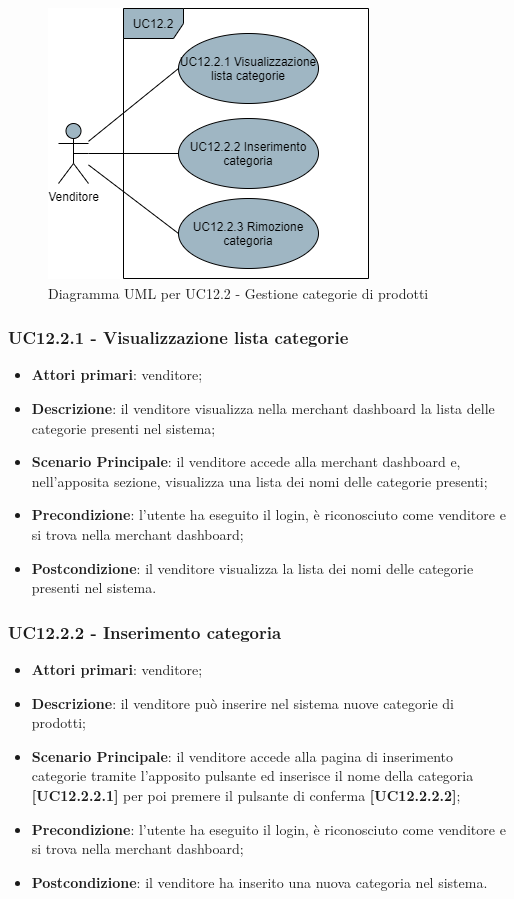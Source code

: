 \begin{figure}[H]
\centering
\includegraphics[scale=0.6]{res/UseCase/Immagini/GestioneCategorie}
\caption{Diagramma UML per UC12.2 - Gestione categorie di prodotti}
\end{figure}

\subsubsection{UC12.2.1 - Visualizzazione lista categorie}
\begin{itemize}
\item \textbf{Attori primari}: venditore;
\item \textbf{Descrizione}: il venditore visualizza nella merchant dashboard la lista delle categorie presenti nel sistema;
\item \textbf{Scenario Principale}: il venditore accede alla merchant dashboard e, nell'apposita sezione, visualizza una lista dei nomi delle categorie presenti;
\item \textbf{Precondizione}: l'utente ha eseguito il login, è riconosciuto come venditore e si trova nella merchant dashboard;
\item \textbf{Postcondizione}: il venditore visualizza la lista dei nomi delle categorie presenti nel sistema.
\end{itemize}

\subsubsection{UC12.2.2 - Inserimento categoria}
\begin{itemize}
\item \textbf{Attori primari}: venditore;
\item \textbf{Descrizione}: il venditore può inserire nel sistema nuove categorie di prodotti;
\item \textbf{Scenario Principale}: il venditore accede alla pagina di inserimento categorie tramite l'apposito pulsante ed inserisce il nome della categoria \textbf{[UC12.2.2.1]} per poi premere il pulsante di conferma \textbf{[UC12.2.2.2]};
\item \textbf{Precondizione}: l'utente ha eseguito il login, è riconosciuto come venditore e si trova nella merchant dashboard;
\item \textbf{Postcondizione}: il venditore ha inserito una nuova categoria nel sistema.
\end{itemize}

